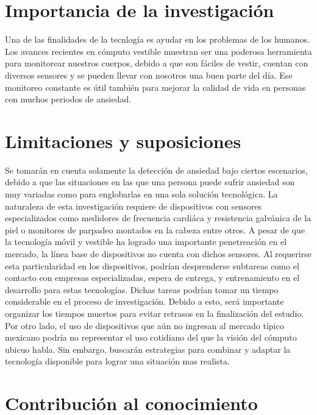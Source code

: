 \documentclass[letterpaper,12pt]{cicese}
\begin{document}
		\chapter{Importancia de la investigaci\'on}
				Una de las finalidades de la tecnlog\'ia es ayudar en los problemas de los humanos. Los avances recientes en c\'omputo vestible muestran
				ser una poderosa herramienta para monitorear nuestros cuerpos, debido a que son f\'aciles de vestir, cuentan con diversos sensores y se pueden
				llevar con nosotros una buen parte del d\'ia. Ese monitoreo constante es \'util tambi\'en para mejorar la calidad de vida en personas con muchos periodos de ansiedad. %
				
					\chapter{Limitaciones y suposiciones}
			Se tomar\'an en cuenta solamente la detecci\'on de ansiedad bajo ciertos escenarios, debido a que las situaciones en las que una persona puede sufrir ansiedad son muy variadas como para englobarlas en una sola soluci\'on tecnol\'ogica.
			La naturaleza de esta investigaci\'on requiere de dispositivos con sensores especializados como medidores de frecuencia cardi\'aca y resistencia galv\'anica de la piel o monitores de parpadeo montados en la cabeza entre otros. A pesar de que la tecnolog\'ia m\'ovil y vestible ha logrado una importante penetreaci\'on en el mercado, la l\'inea base de dispositivos no cuenta con dichos sensores. Al requerirse esta particularidad en los dispositivos, podr\'ian desprenderse subtareas como el contacto con empresas especializadas, espera de entrega, y entrenamiento en el desarrollo para estas tecnolog\'ias. Dichas tareas podr\'ian tomar un tiempo considerable en el proceso de investigaci\'on. Debido a esto, ser\'a importante organizar los tiempos muertos para evitar retrasos en la finalizaci\'on del estudio.
			Por otro lado, el uso de dispositivos que a\'un no ingresan al mercado t\'ipico mexicano podr\'ia no representar el uso cotidiano del que la visi\'on del  c\'omputo ubicuo habla. Sin embargo, buscar\'an estrategias para combinar y adaptar la tecnolog\'ia disponible para lograr una situaci\'on mas realista.
		\chapter{Contribuci\'on al conocimiento}
\end{document}
